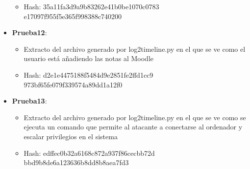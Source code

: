 \begin{itemize}
{\begin{itemize}
      \item{Hash}: 35a11fa3d9a9b83262e41b0be1070c0783\\e17097f955f5e365f998388c740200
    \end{itemize}}
  \item{\textbf{Prueba12}: 
    \begin{itemize}
      \item{Extracto del archivo generado por log2timeline.py en el que se ve como el usuario está añadiendo las notas al Moodle}
      \item{Hash}: d2e1e4475188f5484d9e2851fe2ffd1cc9\\973bf65fe079f339574a89dd1a12f0
    \end{itemize}}
  \item{\textbf{Prueba13}: 
    \begin{itemize}
      \item{Extracto del archivo generado por log2timeline.py en el que se ve como se ejecuta un comando que permite al atacante a conectarse al ordenador y escalar privilegios en el sistema}
      \item{Hash}: edffec0b32a6168c872a937f86cecbb72d\\bbd9b8de6a123636b8dd8b8aea7fd3
    \end{itemize}}

\end{itemize}
